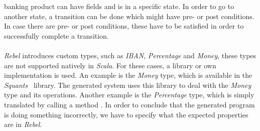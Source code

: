 banking product can have fields and is in a specific state. In order to go to
another state, a transition can be done which might have pre- or post conditions.
In case there are pre- or post conditions, these have to be satisfied in order to
successfully complete a transition.\\
\\
\textit{Rebel} introduces custom types, such as \textit{IBAN},
\textit{Percentage} and \textit{Money}, these types are not supported natively
in \textit{Scala}. For these cases, a library or own implementation is used. An
example is the \textit{Money} type, which is available in the
\textit{Squants}~\cite{siteSquants2017} library. The generated system uses this
library to deal with the \textit{Money} type and its operations. Another example
is the \textit{Percentage} type, which is simply translated by calling a method
. In order to conclude that the generated program is doing
something incorrectly, we have to specify what the expected properties are in
\textit{Rebel}.


